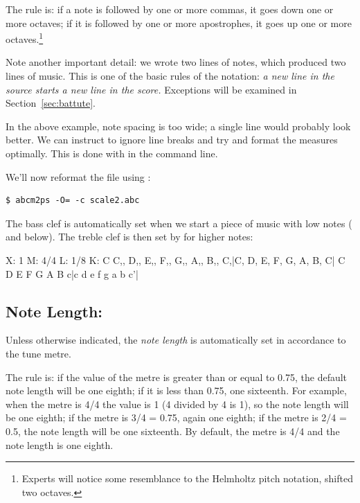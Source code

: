 \documentclass[a4paper,fullpage,12pt]{book}
\begin{document}
The rule is: if a note is followed by one or more commas, it goes down
one or more octaves; if it is followed by one or more apostrophes, it
goes up one or more octaves.\footnote{Experts will notice some
resemblance to the Helmholtz pitch notation, shifted two octaves.} 

Note another important detail: we wrote two lines of \ABC{} notes,
which produced two lines of music. This is one of the basic rules of
the \ABC{} notation: \emph{a new line in the source starts a new
line in the score.} Exceptions will be examined in
Section~\ref{sec:battute}.

In the above example, note spacing is too wide; a single line would
probably look better. We can instruct \abcm{} to ignore line breaks
and try and format the measures optimally. This is done with 
in the command line.

We'll now reformat the file using :

\begin{verbatim}
$ abcm2ps -O= -c scale2.abc
\end{verbatim}



The bass clef is automatically set when we start a piece of music with
low notes ( and below). The treble clef is then set by \abcm{}
for higher notes:

\begin{abcsource}
X: 1
M: 4/4
L: 1/8
K: C
%
C,, D,, E,, F,, G,, A,, B,, C,|C, D, E, F, G, A, B, C|
C D E F G A B c|c d e f g a b c'|
\end{abcsource}



\subsection{Note Length: }
\label{sec:length}

Unless otherwise indicated, the \emph{note length} is automatically
set in accordance to the tune metre.

The rule is: if the value of the metre is greater than or equal to
0.75, the default note length will be one eighth; if it is less than
0.75, one sixteenth. For example, when the metre is 4/4 the value is 1
(4 divided by 4 is 1), so the note length will be one eighth; if the
metre is 3/4 = 0.75, again one eighth; if the metre is 2/4 = 0.5, the
note length will be one sixteenth. By default, the metre is 4/4 and
the note length is one eighth.
\end{document}
